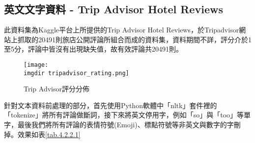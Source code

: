\begin{table}[H]
	\small
    \centering
    \extrarowheight=5pt
    \caption{中文文本處理前後對照}\label{tab.4.2.1.2}
\end{table}

\subsection{英文文字資料 - Trip Advisor Hotel Reviews}

	此資料集為Kaggle平台上所提供的Trip Advisor Hotel Reviews，於Tripadvisor網站上抓取的20491則旅店公開評論所組合而成的資料集，資料期間不詳，評分介於1至5分，評論中皆沒有出現缺失值，故有效評論共20491則。
	
\begin{figure}[H]
    \centering
        \texttt{[image: \\imgdir tripadvisor\_rating.png]}
    \caption{Trip Advisor評分分佈}
    \label{grap4.2.2}
\end{figure}
	
	針對文本資料前處理的部分，首先使用Python軟體中「nltk」套件裡的「tokenize」將所有評論做斷詞，接下來將英文停用字，例如「so」與「too」等單字，最後我們將所有評論的表情符號(Emoji)、標點符號等非英文與數字的字刪掉。效果如表\ref{tab.4.2.2.1}

\begin{table}[H]
	\small
    \centering
    \extrarowheight=5pt
    \caption{英文文本處理前後對照(Trip Advisor)}\label{tab.4.2.2.1}
\end{table}



\newpage
%










